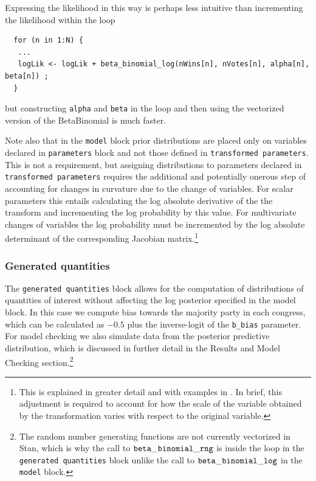 \noindent Expressing the likelihood in this way is perhaps less intuitive than incrementing the likelihood within the loop

\begin{singlespacing}
\small
\begin{verbatim}
  for (n in 1:N) {
   ...
   logLik <- logLik + beta_binomial_log(nWins[n], nVotes[n], alpha[n], beta[n]) ;
  }
\end{verbatim}
\end{singlespacing}
%
\noindent but constructing {\tt alpha} and {\tt beta} in the loop and then using the vectorized version of the BetaBinomial is much faster. 

Note also that in the {\tt model} block prior distributions are placed only on variables declared in {\tt parameters} block and not those defined in {\tt transformed parameters}. This is not a requirement, but assigning distributions to parameters declared in {\tt transformed parameters} requires the additional and potentially onerous step of accounting for changes in curvature due to the change of variables. For scalar parameters this entails calculating the log absolute derivative of the the transform and incrementing the log probability by this value. For multivariate changes of variables the log probability must be incremented by the log absolute determinant of the corresponding Jacobian matrix.\footnote{This is explained in greater detail and with examples in . In brief, this adjustment is required to account for how the scale of the variable obtained by the transformation varies with respect to the original variable.}




\subsubsection{Generated quantities}

The {\tt generated quantities} block allows for the computation of distributions of quantities of interest without affecting the log posterior specified in the model block. In this case we compute bias towards the majority party in each congress, which can be calculated as $-0.5$ plus the inverse-logit of the {\tt b\_bias} parameter. For model checking we also simulate data from the posterior predictive distribution, which is discussed in further detail in the Results and Model Checking section.\footnote{The random number generating functions are not currently vectorized in Stan, which is why the call to ${\tt beta\_binomial\_rng}$ is inside the loop in the {\tt generated quantities} block unlike the call to ${\tt beta\_binomial\_log}$ in the {\tt model} block.} 

